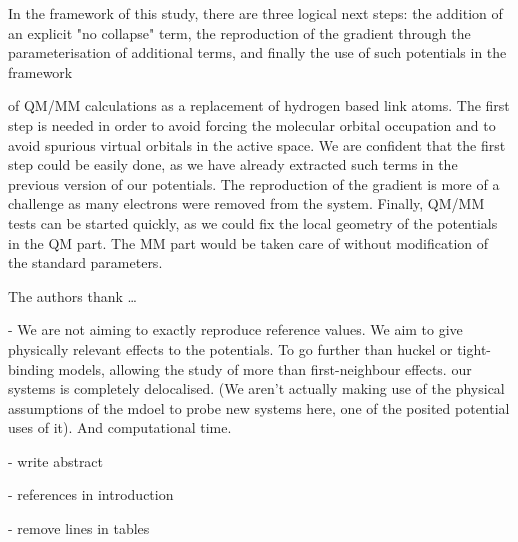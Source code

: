 \documentclass[journal=jctcce,manuscript=article]{achemso}
\begin{document}
In the framework of this study, there are three logical next steps: the addition of an explicit
"no collapse" term, the reproduction of the gradient through the parameterisation
of additional terms, and finally the use of such potentials in the framework

of QM/MM calculations as a replacement of hydrogen based link atoms.
The first step is needed in order to avoid forcing the molecular orbital occupation and
to avoid spurious virtual orbitals in the active space.
We are confident that the first step could be easily done, as we have already extracted such
terms in the previous version of our potentials.
The reproduction of the gradient is more of a challenge as many electrons were removed from the system.
Finally, QM/MM tests can be started quickly, as we could fix the local geometry of the potentials
in the QM part. The MM part would be taken care of without modification of the standard parameters.

\begin{acknowledgement}

The authors thank \ldots

\end{acknowledgement}

- We are not aiming to exactly reproduce reference values. We aim to give physically relevant effects to the potentials. To go further than huckel or tight-binding models, allowing the study of more than first-neighbour effects. our systems is completely delocalised. (We aren't actually making use of the physical assumptions of the mdoel to probe new systems here, one of the posited potential uses of it). And computational time.

- write abstract

- references in introduction

- remove lines in tables
\end{document}
